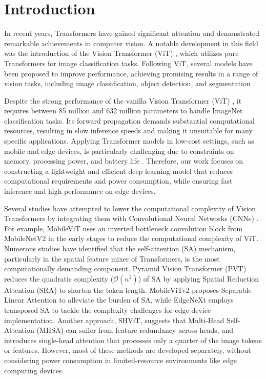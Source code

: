 \section{Introduction}
In recent years, Transformers have gained significant attention and demonstrated remarkable achievements in computer vision. A notable development in this field was the introduction of the Vision Transformer (ViT) \cite{dosovitskiy2020image}, which utilizes pure Transformers for image classification tasks. Following ViT, several models have been proposed to improve performance, achieving promising results in a range of vision tasks, including image classification, object detection, and segmentation \cite{setyawan2024multi, liang2024swin, gao2023metformer, yu2024spikingvit, hsu2024inpainting}.

Despite the strong performance of the vanilla Vision Transformer (ViT) \cite{dosovitskiy2020image}, it requires between 85 million and 632 million parameters to handle ImageNet classification tasks. Its forward propagation demands substantial computational resources, resulting in slow inference speeds and making it unsuitable for many specific applications. Applying Transformer models in low-cost settings, such as mobile and edge devices, is particularly challenging due to constraints on memory, processing power, and battery life \cite{setyawan2024fpga}. Therefore, our work focuses on constructing a lightweight and efficient deep learning model that reduces computational requirements and power consumption, while ensuring fast inference and high performance on edge devices.

Several studies have attempted to lower the computational complexity of Vision Transformers by integrating them with Convolutional Neural Networks (CNNs) \cite{mehta2021mobilevit, wu2021cvt}. For example, MobileViT uses an inverted bottleneck convolution block from MobileNetV2 \cite{sandler2018mobilenetv2} in the early stages to reduce the computational complexity of ViT. Numerous studies \cite{wang2021pyramid, mehta2022separable, maaz2022edgenext} have identified that the self-attention (SA) mechanism, particularly in the spatial feature mixer of Transformers, is the most computationally demanding component. Pyramid Vision Transformer (PVT) reduces the quadratic complexity ($\mathcal{O}(n^2)$) of SA by applying Spatial Reduction Attention (SRA) to shorten the token length. MobileViTv2 proposes Separable Linear Attention \cite{mehta2022separable} to alleviate the burden of SA, while EdgeNeXt \cite{maaz2022edgenext} employs transposed SA to tackle the complexity challenges for edge device implementation. Another approach, SHViT, suggests that Multi-Head Self-Attention (MHSA) can suffer from feature redundancy across heads, and introduces single-head attention that processes only a quarter of the image tokens or features. However, most of these methods are developed separately, without considering power consumption in limited-resource environments like edge computing devices. 

